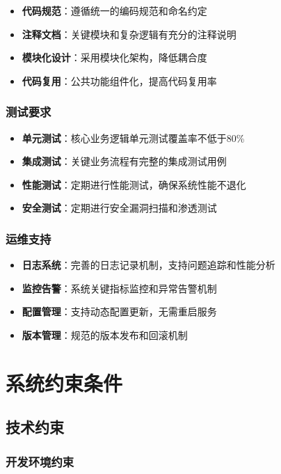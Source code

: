 \documentclass[a4paper]{article}
\begin{document}
\begin{itemize}
    \item \textbf{代码规范}：遵循统一的编码规范和命名约定
    \item \textbf{注释文档}：关键模块和复杂逻辑有充分的注释说明
    \item \textbf{模块化设计}：采用模块化架构，降低耦合度
    \item \textbf{代码复用}：公共功能组件化，提高代码复用率
\end{itemize}

\subsubsection{测试要求}

\begin{itemize}
    \item \textbf{单元测试}：核心业务逻辑单元测试覆盖率不低于80\%
    \item \textbf{集成测试}：关键业务流程有完整的集成测试用例
    \item \textbf{性能测试}：定期进行性能测试，确保系统性能不退化
    \item \textbf{安全测试}：定期进行安全漏洞扫描和渗透测试
\end{itemize}

\subsubsection{运维支持}

\begin{itemize}
    \item \textbf{日志系统}：完善的日志记录机制，支持问题追踪和性能分析
    \item \textbf{监控告警}：系统关键指标监控和异常告警机制
    \item \textbf{配置管理}：支持动态配置更新，无需重启服务
    \item \textbf{版本管理}：规范的版本发布和回滚机制
\end{itemize}

\section{系统约束条件}

\subsection{技术约束}

\subsubsection{开发环境约束}
\end{document}
